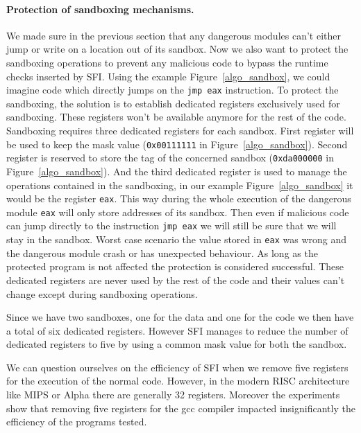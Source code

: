 \documentclass[11pt]{sdm}
\begin{document}
\paragraph{Protection of sandboxing mechanisms.}
\label{par:Protection of sandboxing mechanisms}
We made sure in the previous section that any dangerous modules can't either jump or write on a location out of its sandbox. Now we also want to protect the sandboxing operations to prevent any malicious code to bypass the runtime checks inserted by SFI. Using the example Figure~\ref{algo_sandbox}, we could imagine code which directly jumps on the \texttt{jmp eax} instruction. To protect the sandboxing, the solution is to establish dedicated registers exclusively used for sandboxing. These registers won't be available anymore for the rest of the code. Sandboxing requires three dedicated registers for each sandbox. First register will be used to keep the mask value (\texttt{0x00111111} in Figure~\ref{algo_sandbox}). Second register is reserved to store the tag of the concerned sandbox (\texttt{0xda000000} in Figure~\ref{algo_sandbox}). And the third dedicated register is used to manage the operations contained in the sandboxing, in our example Figure~\ref{algo_sandbox} it would be the register \texttt{eax}. This way during the whole execution of the dangerous module \texttt{eax} will only store addresses of its sandbox. Then even if malicious code can jump directly to the instruction \texttt{jmp eax} we will still be sure that we will stay in the sandbox. 
Worst case scenario the value stored in \texttt{eax} was wrong and the dangerous module crash or has unexpected behaviour. As long as the protected program is not affected the protection is considered successful.
These dedicated registers are never used by the rest of the code and their values can't change except during sandboxing operations.

Since we have two sandboxes, one for the data and one for the code we then have a total of six dedicated registers. However SFI manages to reduce the number of dedicated registers to five by using a common mask value for both the sandbox.

We can question ourselves on the efficiency of SFI when we remove five registers for the execution of the normal code. However, in the modern RISC architecture like MIPS or Alpha there are generally 32 registers. Moreover the experiments~\cite{Wahbe:1993:ESF:173668.168635} show that removing five registers for the gcc compiler impacted insignificantly the efficiency of the programs tested.
\end{document}
